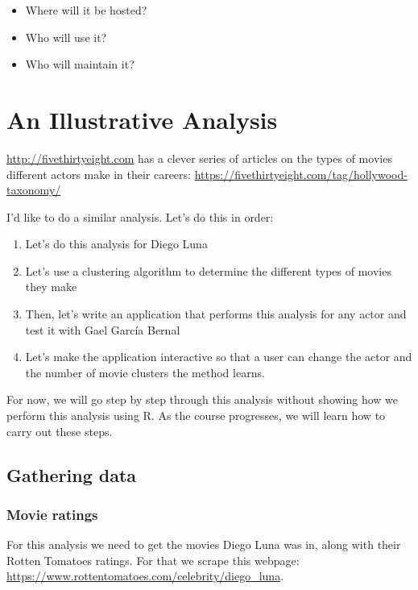 \documentclass[]{book}
\providecommand{\tightlist}{%
  \setlength{\itemsep}{0pt}\setlength{\parskip}{0pt}}
\theoremstyle{definition}
\theoremstyle{definition}
\theoremstyle{remark}
\begin{document}
\begin{itemize}
\tightlist
\item
  Where will it be hosted?
\item
  Who will use it?
\item
  Who will maintain it?
\end{itemize}

\chapter{An Illustrative Analysis}\label{an-illustrative-analysis}

\url{http://fivethirtyeight.com} has a clever series of articles on the
types of movies different actors make in their careers:
\url{https://fivethirtyeight.com/tag/hollywood-taxonomy/}

I'd like to do a similar analysis. Let's do this in order:

\begin{enumerate}
\def\labelenumi{\arabic{enumi})}
\tightlist
\item
  Let's do this analysis for Diego Luna
\item
  Let's use a clustering algorithm to determine the different types of
  movies they make
\item
  Then, let's write an application that performs this analysis for any
  actor and test it with Gael García Bernal
\item
  Let's make the application interactive so that a user can change the
  actor and the number of movie clusters the method learns.
\end{enumerate}

For now, we will go step by step through this analysis without showing
how we perform this analysis using R. As the course progresses, we will
learn how to carry out these steps.

\section{Gathering data}\label{gathering-data}

\subsection{Movie ratings}\label{movie-ratings}

For this analysis we need to get the movies Diego Luna was in, along
with their Rotten Tomatoes ratings. For that we scrape this webpage:
\url{https://www.rottentomatoes.com/celebrity/diego_luna}.
\end{document}

